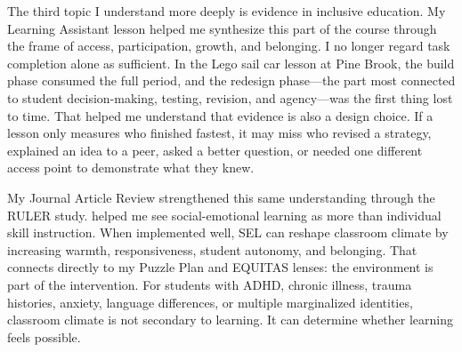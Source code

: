 \documentclass[11pt]{article}
\newcommand{\reviewsection}[1]{\vspace{0.07in}\noindent{\normalsize\bfseries\color{PrimaryRed}#1}\par\vspace{0.02in}}
\begin{document}
The third topic I understand more deeply is evidence in inclusive education. My Learning Assistant lesson helped me synthesize this part of the course through the frame of access, participation, growth, and belonging. I no longer regard task completion alone as sufficient. In the Lego sail car lesson at Pine Brook, the build phase consumed the full period, and the redesign phase---the part most connected to student decision-making, testing, revision, and agency---was the first thing lost to time. That helped me understand that evidence is also a design choice. If a lesson only measures who finished fastest, it may miss who revised a strategy, explained an idea to a peer, asked a better question, or needed one different access point to demonstrate what they knew.

My Journal Article Review strengthened this same understanding through the RULER study. \citet{rivers2013ruler} helped me see social-emotional learning as more than individual skill instruction. When implemented well, SEL can reshape classroom climate by increasing warmth, responsiveness, student autonomy, and belonging. That connects directly to my Puzzle Plan and EQUITAS lenses: the environment is part of the intervention. For students with ADHD, chronic illness, trauma histories, anxiety, language differences, or multiple marginalized identities, classroom climate is not secondary to learning. It can determine whether learning feels possible.

\reviewsection{Topics I Want to Learn More About}
\end{document}
